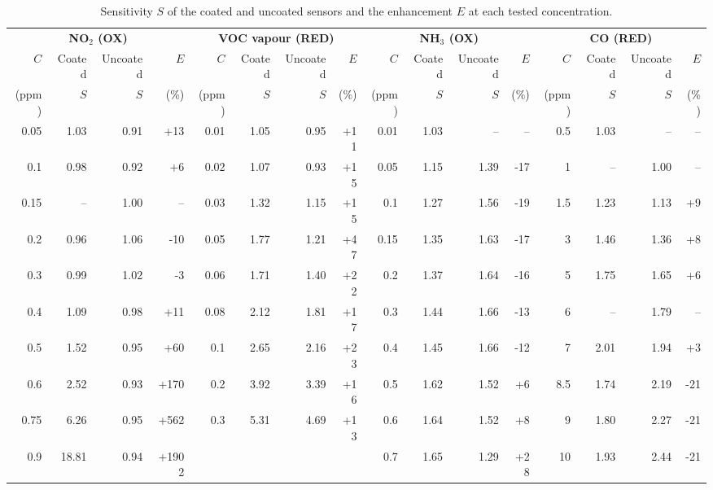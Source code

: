 \documentclass[11pt]{article}
\begin{document}
\setcounter{table}{5}
\fi\fi
\begin{table}[!htbp]
\centering
\caption{Sensitivity $S$ of the coated and uncoated sensors and the enhancement $E$ at each tested concentration.}
\label{tab:enh}
\scriptsize
\setlength{\tabcolsep}{3.2pt}
\begin{adjustbox}{max width=\textwidth,center}
\begin{tabular}{rrrr@{\hspace{14pt}}rrrr@{\hspace{14pt}}rrrr@{\hspace{14pt}}rrrr}
\toprule
\multicolumn{4}{c}{\textbf{NO$_2$ (OX)}} & \multicolumn{4}{c}{\textbf{VOC vapour (RED)}} & \multicolumn{4}{c}{\textbf{NH$_3$ (OX)}} & \multicolumn{4}{c}{\textbf{CO (RED)}} \\
\cmidrule(r{8pt}){1-4}\cmidrule(r{8pt}){5-8}\cmidrule(r{8pt}){9-12}\cmidrule{13-16}
$C$ & Coated & Uncoated & $E$ & $C$ & Coated & Uncoated & $E$ & $C$ & Coated & Uncoated & $E$ & $C$ & Coated & Uncoated & $E$ \\
(ppm) & $S$ & $S$ & (\%) & (ppm) & $S$ & $S$ & (\%) & (ppm) & $S$ & $S$ & (\%) & (ppm) & $S$ & $S$ & (\%) \\
\midrule
0.05 & 1.03 & 0.91 & +13 & 0.01 & 1.05 & 0.95 & +11 & 0.01 & 1.03 & -- & -- & 0.5 & 1.03 & -- & -- \\
0.1 & 0.98 & 0.92 & +6 & 0.02 & 1.07 & 0.93 & +15 & 0.05 & 1.15 & 1.39 & -17 & 1 & -- & 1.00 & -- \\
0.15 & -- & 1.00 & -- & 0.03 & 1.32 & 1.15 & +15 & 0.1 & 1.27 & 1.56 & -19 & 1.5 & 1.23 & 1.13 & +9 \\
0.2 & 0.96 & 1.06 & -10 & 0.05 & 1.77 & 1.21 & +47 & 0.15 & 1.35 & 1.63 & -17 & 3 & 1.46 & 1.36 & +8 \\
0.3 & 0.99 & 1.02 & -3 & 0.06 & 1.71 & 1.40 & +22 & 0.2 & 1.37 & 1.64 & -16 & 5 & 1.75 & 1.65 & +6 \\
0.4 & 1.09 & 0.98 & +11 & 0.08 & 2.12 & 1.81 & +17 & 0.3 & 1.44 & 1.66 & -13 & 6 & -- & 1.79 & -- \\
0.5 & 1.52 & 0.95 & +60 & 0.1 & 2.65 & 2.16 & +23 & 0.4 & 1.45 & 1.66 & -12 & 7 & 2.01 & 1.94 & +3 \\
0.6 & 2.52 & 0.93 & +170 & 0.2 & 3.92 & 3.39 & +16 & 0.5 & 1.62 & 1.52 & +6 & 8.5 & 1.74 & 2.19 & -21 \\
0.75 & 6.26 & 0.95 & +562 & 0.3 & 5.31 & 4.69 & +13 & 0.6 & 1.64 & 1.52 & +8 & 9 & 1.80 & 2.27 & -21 \\
0.9 & 18.81 & 0.94 & +1902 &  &  &  &  & 0.7 & 1.65 & 1.29 & +28 & 10 & 1.93 & 2.44 & -21 \\

\end{tabular}
\end{adjustbox}
\end{table}
\end{document}
